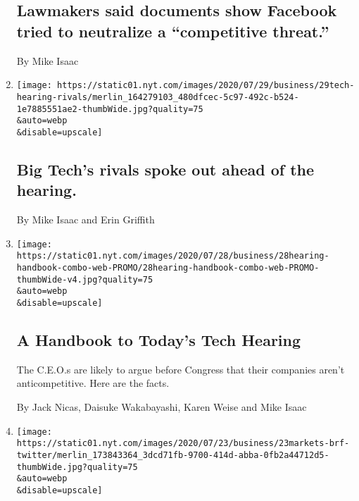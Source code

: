 \begin{enumerate}
{  \subsection{Lawmakers said documents show Facebook tried to neutralize
  a ``competitive
  threat.''}\label{lawmakers-said-documents-show-facebook-tried-to-neutralize-a-competitive-threat}}

  By Mike Isaac
\item
  \href{/live/2020/07/29/technology/tech-ceos-hearing-testimony/big-techs-rivals-spoke-out-ahead-of-the-hearing}{}

  \texttt{[image: https://static01.nyt.com/images/2020/07/29/business/29tech-hearing-rivals/merlin\_164279103\_480dfcec-5c97-492c-b524-1e7885551ae2-thumbWide.jpg?quality=75\\\&auto=webp\\\&disable=upscale]}

  \hypertarget{big-techs-rivals-spoke-out-ahead-of-the-hearing}{%
  \subsection{Big Tech's rivals spoke out ahead of the
  hearing.}\label{big-techs-rivals-spoke-out-ahead-of-the-hearing}}

  By Mike Isaac and Erin Griffith
\item
  \href{/2020/07/29/technology/tech-ceos-congress-what-to-know.html}{}

  \texttt{[image: https://static01.nyt.com/images/2020/07/28/business/28hearing-handbook-combo-web-PROMO/28hearing-handbook-combo-web-PROMO-thumbWide-v4.jpg?quality=75\\\&auto=webp\\\&disable=upscale]}

  \hypertarget{a-handbook-to-todays-tech-hearing}{%
  \subsection{A Handbook to Today's Tech
  Hearing}\label{a-handbook-to-todays-tech-hearing}}

  The C.E.O.s are likely to argue before Congress that their companies
  aren't anticompetitive. Here are the facts.

  By Jack Nicas, Daisuke Wakabayashi, Karen Weise and Mike Isaac
\item
  \href{/2020/07/23/business/twitter-earnings.html}{}

  \texttt{[image: https://static01.nyt.com/images/2020/07/23/business/23markets-brf-twitter/merlin\_173843364\_3dcd71fb-9700-414d-abba-0fb2a44712d5-thumbWide.jpg?quality=75\\\&auto=webp\\\&disable=upscale]}


\end{enumerate}
